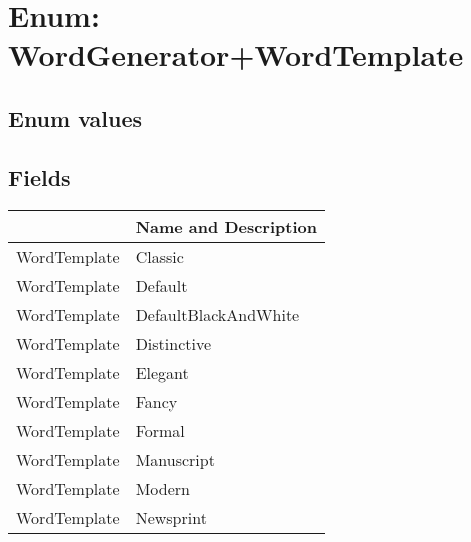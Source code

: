 \documentclass[11pt, oneside, a4paper]{book}
\begin{document}
\section{Enum: WordGenerator+WordTemplate}

\subsection{Enum values}

\subsection{Fields}
\begin{center}
\begin{tabular}{| p{3cm} | p{12cm} | }
\hline
\textbf{ } & \textbf{ Name and Description}\\
\hline
 WordTemplate &  Classic\hypertarget{SoftwareEngineeringTools.{}Documentation.{}WordGenerator+WordTemplate.{}Classic}{}\\
\hline
 WordTemplate &  Default\hypertarget{SoftwareEngineeringTools.{}Documentation.{}WordGenerator+WordTemplate.{}Default}{}\\
\hline
 WordTemplate &  DefaultBlackAndWhite\hypertarget{SoftwareEngineeringTools.{}Documentation.{}WordGenerator+WordTemplate.{}DefaultBlackAndWhite}{}\\
\hline
 WordTemplate &  Distinctive\hypertarget{SoftwareEngineeringTools.{}Documentation.{}WordGenerator+WordTemplate.{}Distinctive}{}\\
\hline
 WordTemplate &  Elegant\hypertarget{SoftwareEngineeringTools.{}Documentation.{}WordGenerator+WordTemplate.{}Elegant}{}\\
\hline
 WordTemplate &  Fancy\hypertarget{SoftwareEngineeringTools.{}Documentation.{}WordGenerator+WordTemplate.{}Fancy}{}\\
\hline
 WordTemplate &  Formal\hypertarget{SoftwareEngineeringTools.{}Documentation.{}WordGenerator+WordTemplate.{}Formal}{}\\
\hline
 WordTemplate &  Manuscript\hypertarget{SoftwareEngineeringTools.{}Documentation.{}WordGenerator+WordTemplate.{}Manuscript}{}\\
\hline
 WordTemplate &  Modern\hypertarget{SoftwareEngineeringTools.{}Documentation.{}WordGenerator+WordTemplate.{}Modern}{}\\
\hline
 WordTemplate &  Newsprint\hypertarget{SoftwareEngineeringTools.{}Documentation.{}WordGenerator+WordTemplate.{}Newsprint}{}\\

\end{tabular}
\end{center}
\end{document}
